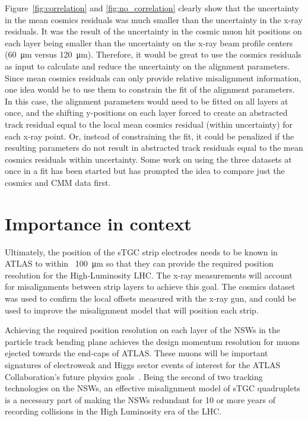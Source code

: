 Figure~\ref{fig:correlation} and \ref{fig:no_correlation} clearly show that the uncertainty in the mean cosmics residuals was much smaller than the uncertainty in the x-ray residuals. It was the result of the uncertainty in the cosmic muon hit positions on each layer being smaller than the uncertainty on the x-ray beam profile centers (\SI{60}{\micro\meter} versus \SI{120}{\micro\meter}). Therefore, it would be great to use the cosmics residuals as input to calculate and reduce the uncertainty on the alignment parameters. Since mean cosmics residuals can only provide relative misalignment information, one idea would be to use them to constrain the fit of the alignment parameters. In this case, the alignment parameters would need to be fitted on all layers at once, and the shifting y-positions on each layer forced to create an abstracted track residual equal to the local mean cosmics residual (within uncertainty) for each x-ray point. Or, instead of constraining the fit, it could be penalized if the resulting parameters do not result in abstracted track residuals equal to the mean cosmics residuals within uncertainty. Some work on using the three datasets at once in a fit has been started but has prompted the idea to compare just the cosmics and CMM data first.

\section{Importance in context}
\label{sec:importance}

Ultimately, the position of the sTGC strip electrodes needs to be known in ATLAS to within ~\SI{100}{\micro\meter} so that they can provide the required position resolution for the High-Luminosity LHC. The x-ray measurements will account for misalignments between strip layers to achieve this goal. The cosmics dataset was used to confirm the local offsets measured with the x-ray gun, and could be used to improve the misalignment model that will position each strip.

Achieving the required position resolution on each layer of the NSWs in the particle track bending plane achieves the design momentum resolution for muons ejected towards the end-caps of ATLAS. These muons will be important signatures of electroweak and Higgs sector events of interest for the ATLAS Collaboration's future physics goals~\cite{nsw_tdr}. Being the second of two tracking technologies on the NSWs, an effective misalignment model of sTGC quadruplets is a necessary part of making the NSWs redundant for 10 or more years of recording collisions in the High Luminosity era of the LHC. 